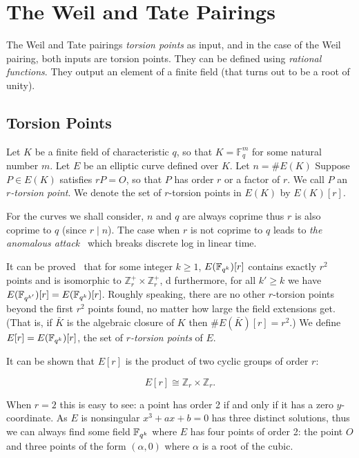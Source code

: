 \chapter {The Weil and Tate Pairings}

The Weil and Tate pairings \emph{torsion points}
as input, and in the case of the Weil pairing, both inputs are torsion points.
They can be defined using \emph{rational functions}.
They output an element of a finite field (that turns out to be a root of unity).

\section {Torsion Points}

Let $K$ be a finite field of characteristic $q$, so that
$K = \mathbb{F}_q^m$ for some natural number $m$.
Let $E$ be an elliptic curve defined
over $K$. Let $n=\#E(K)$
Suppose $P\in E(K)$ satisfies $r P = O$, so that $P$ has order $r$ or a
factor of $r$.
We call $P$ an \emph{$r$-torsion point}.
We denote the set of $r$-torsion points in $E(K)$ by
$E(K)[r]$.

For the curves we shall consider,
$n$ and $q$ are always coprime thus $r$ is also coprime to $q$
(since $r \mid n$).
The case when $r$ is not coprime
to $q$ leads to \emph{the anomalous attack}~\cite[Section V.3]{bss}
which breaks discrete log in linear time.

It can be proved~\cite{silverman} that for some integer $k \ge 1$,
$E(\mathbb{F}_{q^k})[r]$ contains exactly $r^2$ points and is isomorphic to
$\mathbb{Z}_r^+ \times \mathbb{Z}_r^+$,
d furthermore, for all $k' \ge k$ we have $E(\mathbb{F}_{q^{k'}})[r]
= E(\mathbb{F}_{q^k})[r]$.
Roughly speaking, there are no other $r$-torsion points beyond the
first $r^2$ points found, no matter how large the field extensions get.
(That is, if $\bar{K}$ is the algebraic closure of $K$ then $\#E(\bar{K})[r] = r^2$.)
We define $E[r] = E(\mathbb{F}_{q^k})[r]$, the set of
\emph{$r$-torsion points} of $E$.

It can be shown that $E[r]$ is the product of two cyclic groups of order $r$:

\[ E[r] \cong \mathbb{Z}_r \times \mathbb{Z}_r . \]

When $r=2$ this is easy to see: a point has order 2 if and only if it has
a zero $y$-coordinate. As $E$ is nonsingular
$x^3 + ax + b = 0$ has three distinct solutions, thus we can always find
some field $\mathbb{F}_{q^k}$ where $E$ has
four points of order 2: the point $O$ and three points of the form
$(\alpha, 0)$ where $\alpha$ is a root of the cubic.

